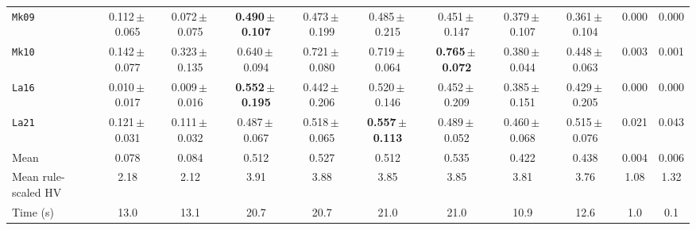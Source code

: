\begin{table}[htbp]
\begin{tabular}{lcccccccccc}
\texttt{Mk09} & 0.112\,$\pm$\,0.065 & 0.072\,$\pm$\,0.075 & \textbf{0.490\,$\pm$\,0.107} & 0.473\,$\pm$\,0.199 & 0.485\,$\pm$\,0.215 & 0.451\,$\pm$\,0.147 & 0.379\,$\pm$\,0.107 & 0.361\,$\pm$\,0.104 & 0.000 & 0.000 \\
\texttt{Mk10} & 0.142\,$\pm$\,0.077 & 0.323\,$\pm$\,0.135 & 0.640\,$\pm$\,0.094 & 0.721\,$\pm$\,0.080 & 0.719\,$\pm$\,0.064 & \textbf{0.765\,$\pm$\,0.072} & 0.380\,$\pm$\,0.044 & 0.448\,$\pm$\,0.063 & 0.003 & 0.001 \\
\texttt{La16} & 0.010\,$\pm$\,0.017 & 0.009\,$\pm$\,0.016 & \textbf{0.552\,$\pm$\,0.195} & 0.442\,$\pm$\,0.206 & 0.520\,$\pm$\,0.146 & 0.452\,$\pm$\,0.209 & 0.385\,$\pm$\,0.151 & 0.429\,$\pm$\,0.205 & 0.000 & 0.000 \\
\texttt{La21} & 0.121\,$\pm$\,0.031 & 0.111\,$\pm$\,0.032 & 0.487\,$\pm$\,0.067 & 0.518\,$\pm$\,0.065 & \textbf{0.557\,$\pm$\,0.113} & 0.489\,$\pm$\,0.052 & 0.460\,$\pm$\,0.068 & 0.515\,$\pm$\,0.076 & 0.021 & 0.043 \\
\midrule
Mean & 0.078 & 0.084 & 0.512 & 0.527 & 0.512 & 0.535 & 0.422 & 0.438 & 0.004 & 0.006 \\
Mean rule-scaled HV & 2.18 & 2.12 & 3.91 & 3.88 & 3.85 & 3.85 & 3.81 & 3.76 & 1.08 & 1.32 \\
Time (s) & 13.0 & 13.1 & 20.7 & 20.7 & 21.0 & 21.0 & 10.9 & 12.6 & 1.0 & 0.1 \\
\bottomrule
\end{tabular}
\end{table}
